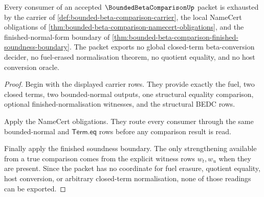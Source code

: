 \begin{theorem}
\label{thm:bounded-beta-comparison-nonescape}
Every consumer of an accepted $\BoundedBetaComparisonUp$ packet is exhausted by
the carrier of \autoref{def:bounded-beta-comparison-carrier}, the local
NameCert obligations of
\autoref{thm:bounded-beta-comparison-namecert-obligations}, and the
finished-normal-form boundary of
\autoref{thm:bounded-beta-comparison-finished-soundness-boundary}. The packet
exports no global closed-term beta-conversion decider, no fuel-erased
normalisation theorem, no quotient equality, and no host conversion oracle.
\end{theorem}
\begin{proof}
Begin with the displayed carrier rows. They provide exactly the fuel, two
closed terms, two bounded-normal outputs, one structural equality comparison,
optional finished-normalisation witnesses, and the structural BEDC rows.

Apply the NameCert obligations. They route every consumer through the same
bounded-normal and $\mathsf{Term.eq}$ rows before any comparison result is
read.

Finally apply the finished soundness boundary. The only strengthening available
from a true comparison comes from the explicit witness rows $w_t,w_u$ when
they are present. Since the packet has no coordinate for fuel erasure,
quotient equality, host conversion, or arbitrary closed-term normalisation,
none of those readings can be exported.
\end{proof}

\begin{closurestatus}{\BoundedBetaComparisonUp}
  \theoryclosure{\seedClosure}
  \formalstatus{\unformalizedV}
\end{closurestatus}
